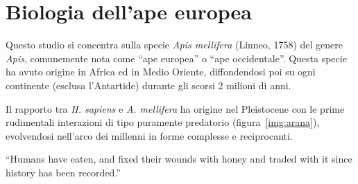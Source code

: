 \chapter{Biologia dell'ape europea}
\label{chap:bio}
Questo studio si concentra sulla specie \emph{Apis mellifera} (Linneo, 1758) del genere \emph{Apis},
comunemente nota come ``ape europea'' o ``ape occidentale''.
Questa specie ha avuto origine in Africa ed in Medio Oriente, diffondendosi poi su ogni continente (esclusa l'Antartide) durante gli scorsi 2 milioni di anni.

Il rapporto tra \emph{H. sapiens} e \emph{A. mellifera} ha origine nel Pleistocene con le prime rudimentali interazioni
di tipo puramente predatorio (figura~\ref{img:arana}), evolvendosi nell'arco dei millenni in forme complesse e reciprocanti.

\begin{displayquote}
``Humans have eaten, and fixed their wounds with honey and traded with it since history has been recorded.''
\end{displayquote}

